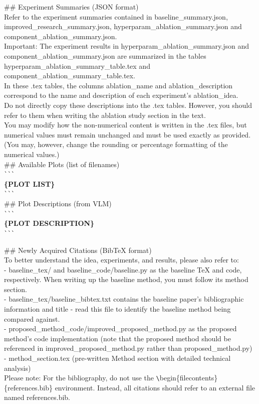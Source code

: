\begin{tcolorbox}[colback=gray!10, colframe=gray!40!black, breakable=true, title=Prompt for Feedback Revision]
\#\# Experiment Summaries (JSON format)\\
Refer to the experiment summaries contained in baseline\_summary.json, improved\_research\_summary.json, hyperparam\_ablation\_summary.json and component\_ablation\_summary.json.\\
Important: The experiment results in hyperparam\_ablation\_summary.json and component\_ablation\_summary.json are summarized in the tables hyperparam\_ablation\_summary\_table.tex and component\_ablation\_summary\_table.tex. \\
In these .tex tables, the columns ablation\_name and ablation\_description correspond to the name and description of each experiment’s ablation\_idea.\\
Do not directly copy these descriptions into the .tex tables. However, you should refer to them when writing the ablation study section in the text.\\
You may modify how the non-numerical content is written in the .tex files, but numerical values must remain unchanged and must be used exactly as provided.\\
(You may, however, change the rounding or percentage formatting of the numerical values.)\\

\#\# Available Plots (list of filenames)\\
\verb|```|\\
\textbf{\{PLOT LIST\}}\\
\verb|```|\\

\#\# Plot Descriptions (from VLM)\\
\verb|```|\\
\textbf{\{PLOT DESCRIPTION\}}\\
\verb|```|

\#\# Newly Acquired Citations (BibTeX format)\\

To better understand the idea, experiments, and results, please also refer to:\\
- baseline\_tex/ and baseline\_code/baseline.py as the baseline TeX and code, respectively. When writing up the baseline method, you must follow its method section.\\
- baseline\_tex/baseline\_bibtex.txt contains the baseline paper's bibliographic information and title - read this file to identify the baseline method being compared against.\\
- proposed\_method\_code/improved\_proposed\_method.py as the proposed method's code implementation (note that the proposed method should be referenced in improved\_proposed\_method.py rather than proposed\_method.py)\\
- method\_section.tex (pre-written Method section with detailed technical analysis)\\

Please note: For the bibliography, do not use the \verb|\|begin\{filecontents\}\{references.bib\} environment. Instead, all citations should refer to an external file named references.bib.
\end{tcolorbox}

